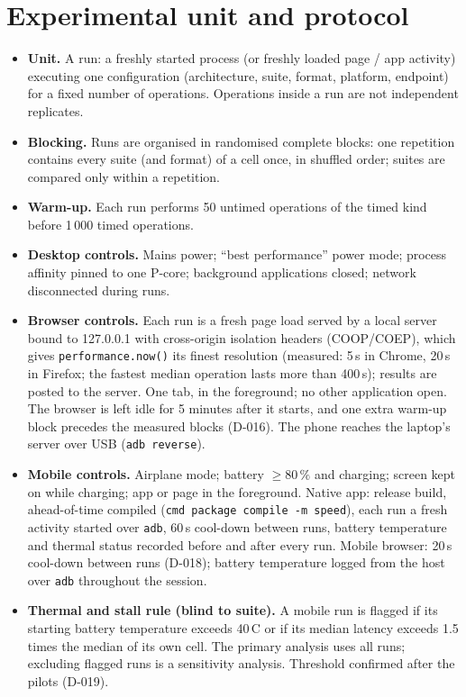 \documentclass[11pt,a4paper]{article}
\begin{document}
\section{Experimental unit and protocol}\label{sec:protocol}
\begin{itemize}
\item \textbf{Unit.} A run: a freshly started process (or freshly loaded page / app activity) executing one configuration (architecture, suite, format, platform, endpoint) for a fixed number of operations. Operations inside a run are not independent replicates.
\item \textbf{Blocking.} Runs are organised in randomised complete blocks: one repetition contains every suite (and format) of a cell once, in shuffled order; suites are compared only within a repetition.
\item \textbf{Warm-up.} Each run performs 50 untimed operations of the timed kind before 1\,000 timed operations.
\item \textbf{Desktop controls.} Mains power; ``best performance'' power mode; process affinity pinned to one P-core; background applications closed; network disconnected during runs.
\item \textbf{Browser controls.} Each run is a fresh page load served by a local server bound to 127.0.0.1 with cross-origin isolation headers (COOP/COEP), which gives \texttt{performance.now()} its finest resolution (measured: 5\,\textmu s in Chrome, 20\,\textmu s in Firefox; the fastest median operation lasts more than 400\,\textmu s); results are posted to the server. One tab, in the foreground; no other application open. The browser is left idle for 5 minutes after it starts, and one extra warm-up block precedes the measured blocks (D-016). The phone reaches the laptop's server over USB (\texttt{adb reverse}).
\item \textbf{Mobile controls.} Airplane mode; battery $\geq 80\,\%$ and charging; screen kept on while charging; app or page in the foreground. Native app: release build, ahead-of-time compiled (\texttt{cmd package compile -m speed}), each run a fresh activity started over \texttt{adb}, 60\,s cool-down between runs, battery temperature and thermal status recorded before and after every run. Mobile browser: 20\,s cool-down between runs (D-018); battery temperature logged from the host over \texttt{adb} throughout the session.
\item \textbf{Thermal and stall rule (blind to suite).} A mobile run is flagged if its starting battery temperature exceeds 40\,\textdegree C or if its median latency exceeds 1.5 times the median of its own cell. The primary analysis uses all runs; excluding flagged runs is a sensitivity analysis. Threshold confirmed after the pilots (D-019).

\end{itemize}
\end{document}
